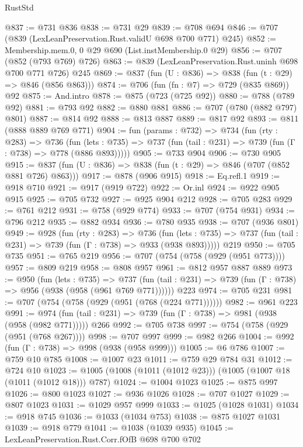 \begin{lexlean}{RustStd}
\begin{coremodule}
@837 := @731 @836
@838 := @731 @29
@839 := @708 @694
@846 := @707 (@839 (LexLeanPreservation.Rust.validU @698 @700 @771) @245)
@852 := Membership.mem.{0, 0} @29 @690 (List.instMembership.{0} @29)
@856 := @707 (@852 (@793 @769) @726)
@863 := @839 (LexLeanPreservation.Rust.uninh @698 @700 @771 @726) @245
@869 := @837 (fun (U : @836) => @838 (fun (t : @29) => @846 (@856 @863)))
@874 := @706 (fun (fn : @7) => @729 (@835 @869)) @92
@875 := And.intro
@878 := @875 (@723 (@725 @92))
@880 := @788 (@789 @92)
@881 := @793 @92
@882 := @880 @881
@886 := @707 (@780 (@882 @797) @801)
@887 := @814 @92
@888 := @813 @887
@889 := @817 @92
@893 := @811 (@888 @889 @769 @771)
@904 := fun (params : @732) =>
  @734
    (fun (rty : @283) =>
    @736
      (fun (lets : @735) => @737 (fun (tail : @231) => @739 (fun (Γ : @738) => @778 (@886 @893)))))
@905 := @733 @904
@906 := @730 @905
@915 := @837 (fun (U : @836) => @838 (fun (t : @29) => @846 (@707 (@852 @881 @726) @863)))
@917 := @878 (@906 @915)
@918 := Eq.refl.{1}
@919 := @918 @710
@921 := @917 (@919 @722)
@922 := Or.inl
@924 := @922 @905 @915
@925 := @705 @732
@927 := @925 @904 @212
@928 := @705 @283
@929 := @761 @212
@931 := @758 (@929 @774)
@933 := @707 (@754 @931)
@934 := @796 @212
@935 := @882 @934
@936 := @780 @935
@938 := @707 (@936 @801)
@949 := @928
    (fun (rty : @283) =>
    @736
      (fun (lets : @735) => @737 (fun (tail : @231) => @739 (fun (Γ : @738) => @933 (@938 @893)))))
    @219
@950 := @705 @735
@951 := @765 @219
@956 := @707 (@754 (@758 (@929 (@951 @773))))
@957 := @809 @219
@958 := @808 @957
@961 := @812 @957 @887 @889
@973 := @950
    (fun (lets : @735) =>
    @737 (fun (tail : @231) => @739 (fun (Γ : @738) => @956 (@938 (@958 (@961 @769 @771))))))
    @223
@974 := @705 @231
@981 := @707 (@754 (@758 (@929 (@951 (@768 (@224 @771))))))
@982 := @961 @223
@991 := @974 (fun (tail : @231) => @739 (fun (Γ : @738) => @981 (@938 (@958 (@982 @771))))) @266
@992 := @705 @738
@997 := @754 (@758 (@929 (@951 (@768 @267))))
@998 := @707 @997
@999 := @982 @266
@1004 := @992 (fun (Γ : @738) => @998 (@938 (@958 @999)))
@1005 := @6 @786
@1007 := @759 @10 @785
@1008 := @1007 @23
@1011 := @759 @29 @784 @31
@1012 := @724 @10
@1023 := @1005 (@1008 (@1011 (@1012 @23))) (@1005 (@1007 @18 (@1011 (@1012 @18))) @787)
@1024 := @1004 @1023
@1025 := @875 @997
@1026 := @800 @1023
@1027 := @936 @1026
@1028 := @707 @1027
@1029 := @807 @1023
@1031 := @1029 @957 @999
@1033 := @1025 (@1028 @1031)
@1034 := @918 @745
@1036 := @1033 (@1034 @753)
@1038 := @875 @1027 @1031
@1039 := @918 @779
@1041 := @1038 (@1039 @935)
@1045 := LexLeanPreservation.Rust.Corr.fOfB @698 @700 @702

\end{coremodule}
\end{lexlean}
